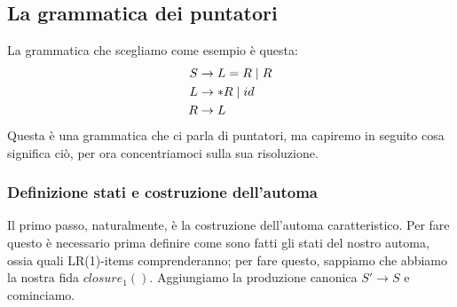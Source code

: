\documentclass[class=book, crop=false, oneside, 12pt]{standalone}
\begin{document}
\subsection{La grammatica dei puntatori}
La grammatica che scegliamo come esempio è questa:
\begin{align}
    \label{gr:pointers-grammar}
    S &\to L = R \mid R \\
    L &\to *R \mid id \nonumber \\ \notag
    R &\to L \notag
\end{align}
Questa è una grammatica che ci parla di puntatori, ma capiremo in seguito cosa significa ciò, per ora concentriamoci sulla sua risoluzione. 

\subsubsection{Definizione stati e costruzione dell'automa}
Il primo passo, naturalmente, è la costruzione dell'automa caratteristico. Per fare questo è necessario prima definire come sono fatti gli stati del nostro automa, ossia quali LR(1)-items comprenderanno; per fare questo, sappiamo che abbiamo la nostra fida \(closure_1()\). Aggiungiamo la produzione canonica \(S' \to S\) e cominciamo.
\end{document}
